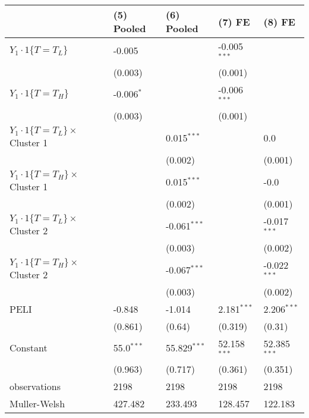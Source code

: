 \begin{tabular}{lllll}
\hline
 & (5) Pooled & (6) Pooled & (7) FE & (8) FE \\
\hline
$Y_1\cdot1\{T=T_L\}$ & -0.005 &  & -0.005$^{***}$ &  \\
 & (0.003) &  & (0.001) &  \\
$Y_1\cdot1\{T=T_H\}$ & -0.006$^{*}$ &  & -0.006$^{***}$ &  \\
 & (0.003) &  & (0.001) &  \\
$Y_1\cdot1\{T=T_L\}\times$ Cluster 1 &  & 0.015$^{***}$ &  & 0.0 \\
 &  & (0.002) &  & (0.001) \\
$Y_1\cdot1\{T=T_H\}\times$ Cluster 1 &  & 0.015$^{***}$ &  & -0.0 \\
 &  & (0.002) &  & (0.001) \\
$Y_1\cdot1\{T=T_L\}\times$ Cluster 2 &  & -0.061$^{***}$ &  & -0.017$^{***}$ \\
 &  & (0.003) &  & (0.002) \\
$Y_1\cdot1\{T=T_H\}\times$ Cluster 2 &  & -0.067$^{***}$ &  & -0.022$^{***}$ \\
 &  & (0.003) &  & (0.002) \\
PELI & -0.848 & -1.014 & 2.181$^{***}$ & 2.206$^{***}$ \\
 & (0.861) & (0.64) & (0.319) & (0.31) \\
Constant & 55.0$^{***}$ & 55.829$^{***}$ & 52.158$^{***}$ & 52.385$^{***}$ \\
 & (0.963) & (0.717) & (0.361) & (0.351) \\\hline

observations & 2198 & 2198 & 2198 & 2198 \\
Muller-Welsh & 427.482 & 233.493 & 128.457 & 122.183 \\
\hline
\end{tabular}
